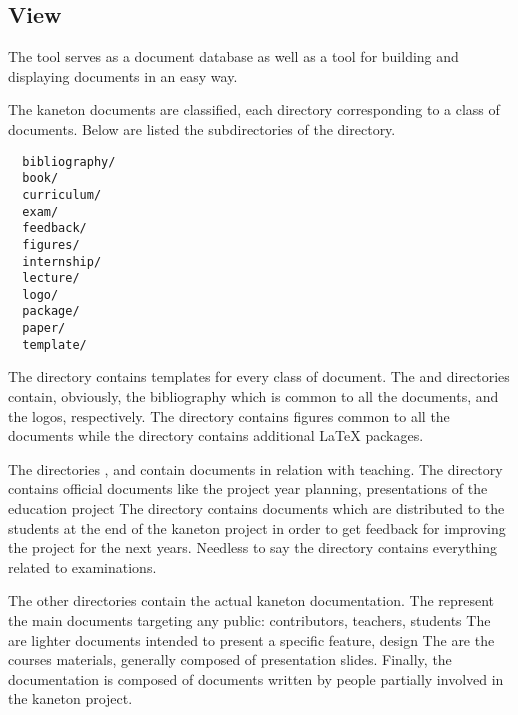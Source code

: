 %
%
%
%
%
%

%
%

\subsection{View}
\label{section:view}

The  tool serves as a document database as well as a tool for
building and displaying documents in an easy way.

The kaneton documents are classified, each directory corresponding to a
class of documents. Below are listed the subdirectories of the 
directory.

\begin{verbatim}
  bibliography/
  book/
  curriculum/
  exam/
  feedback/
  figures/
  internship/
  lecture/
  logo/
  package/
  paper/
  template/
\end{verbatim}

The  directory contains templates for every class of
document. The  and  directories
contain, obviously, the bibliography which is common to all the documents, and
the logos, respectively. The  directory contains figures
common to all the documents while the  directory contains
additional {\LaTeX} packages.

The directories ,  and
 contain documents in relation with teaching. The
 directory contains official documents like the project
year planning, presentations of the education project \etc{} The
 directory contains documents which are distributed to the
students at the end of the kaneton project in order to get feedback for
improving the project for the next years. Needless to say the 
directory contains everything related to examinations.

The other directories contain the actual kaneton documentation. The
 represent the main documents targeting any public:
contributors, teachers, students \etc{} The  are lighter
documents intended to present a specific feature, design \etc{} The
 are the courses materials, generally composed of
presentation slides. Finally, the  documentation is
composed of documents written by people partially involved in the kaneton
project.

